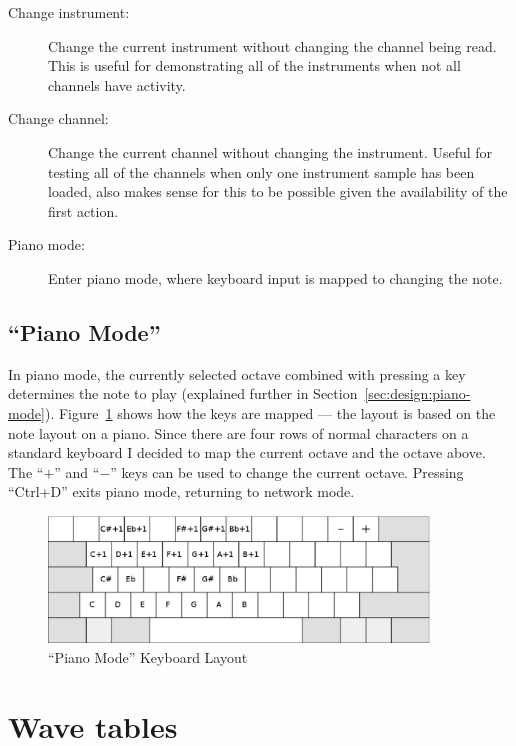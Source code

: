 \begin{description}
\item[Change instrument:] Change the current instrument without changing the channel being read.  
This is useful for demonstrating all of the instruments when not all channels have activity.
\item[Change channel:] Change the current channel without changing the instrument.  Useful for 
testing all of the channels when only one instrument sample has been loaded, also makes sense for 
this to be possible given the availability of the first action.
\item[Piano mode:] Enter piano mode, where keyboard input is mapped to changing the note.
\end{description}

\subsection{``Piano Mode''}

In piano mode, the currently selected octave combined with pressing a key determines the note to 
play (explained further in Section~\ref{sec:design:piano-mode}).  Figure~\ref{fig:piano-mode} shows 
how the keys are mapped --- the layout is based on the note layout on a piano.  Since there are four 
rows of normal characters on a standard keyboard I decided to map the current octave and the octave 
above.  The ``$+$'' and ``$-$'' keys can be used to change the current octave.  Pressing ``Ctrl+D'' 
exits piano mode, returning to network mode.

\begin{figure}
\centering
\includegraphics[width=0.9\textwidth]{images/piano-mode}
\caption{``Piano Mode'' Keyboard Layout}\label{fig:piano-mode}
\end{figure}

\section{Wave tables}
\label{wavetables}


